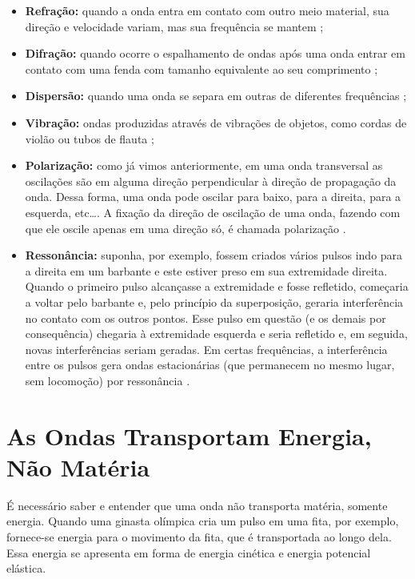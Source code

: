 \begin{itemize}
			\item\textbf{Refração: }quando a onda entra em contato com outro meio material, sua direção e velocidade variam, mas sua frequência se mantem \cite{seth}; 
			
			\item\textbf{Difração: }quando ocorre o espalhamento de ondas após uma onda entrar em contato com uma fenda com tamanho equivalente ao seu comprimento \cite{seth};
			
			\item\textbf{Dispersão: }quando uma onda se separa em outras de diferentes frequências \cite{seth}; 
			
			\item\textbf{Vibração: }ondas produzidas através de vibrações de objetos, como cordas de violão ou tubos de flauta \cite{seth}; 
			
			\item\textbf{Polarização: }como já vimos anteriormente, em uma onda transversal as oscilações são em alguma direção perpendicular à direção de propagação da onda. Dessa forma, uma onda pode oscilar para baixo, para a direita, para a esquerda, etc\dots. A fixação da direção de oscilação de uma onda, fazendo com que ele oscile apenas em uma direção só, é chamada polarização \cite{wiki:polarization}.
			
			\item\textbf{Ressonância: }suponha, por exemplo, fossem criados vários pulsos indo para a direita em um barbante e este estiver preso em sua extremidade direita. Quando o primeiro pulso alcançasse a extremidade e fosse refletido, começaria a voltar pelo barbante e, pelo princípio da superposição, geraria interferência no contato com os outros pontos. Esse pulso em questão (e os demais por consequência) chegaria à extremidade esquerda e seria refletido e, em seguida, novas interferências seriam geradas. Em certas frequências, a interferência entre os pulsos gera ondas estacionárias (que permanecem no mesmo lugar, sem locomoção) por ressonância \cite{halliday}.  
			
		\end{itemize}
	
	\section{As Ondas Transportam Energia, Não Matéria}
		É necessário saber e entender que uma onda não transporta matéria, somente energia. Quando uma ginasta olímpica cria um pulso em uma fita, por exemplo, fornece-se energia para o movimento da fita, que é transportada ao longo dela. Essa energia se apresenta em forma de energia cinética e energia potencial elástica. 
				
